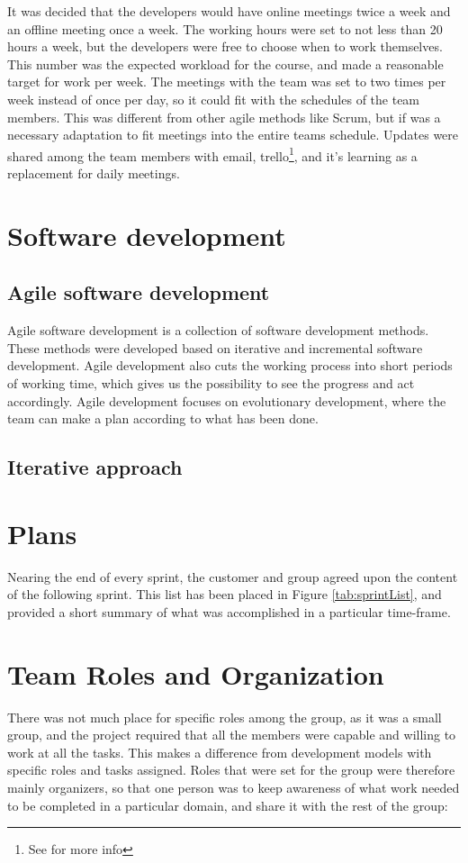 It was decided that the developers would have online meetings twice a week and an offline meeting once a week. 
The working hours were set to not less than 20 hours a week, but the developers were free to choose when to work themselves. This number was the expected workload for the course, and made a reasonable target for work per week. The meetings with the team was set to two times per week instead of once per day, so it could fit with the schedules of the team members. This was different from other agile methods like Scrum, but if was a necessary adaptation to fit meetings into the entire teams schedule. Updates were shared among the team members with email, trello\footnote{See \pageref{def:trello} for more info}, and it's learning as a replacement for daily meetings.
\section{Software development}
\subsection{Agile software development}
Agile software development is a collection of software development methods. These methods were developed based on iterative and incremental software development. Agile development also cuts the working process into short periods of working time, which gives us the possibility to see the progress and act accordingly. Agile development focuses on evolutionary development, where the team can make a plan according to what has been done.  

\subsection{Iterative approach}

\section{Plans}

Nearing the end of every sprint, the customer and group agreed upon the content of the following sprint. This list has been placed in Figure \ref{tab:sprintList}, and provided a short summary of what was accomplished in a particular time-frame. 


\section{Team Roles and Organization}
There was not much place for specific roles among the group, as it was a small group, and the project required that all the members were capable and willing to work at all the tasks. This makes a difference from development models with specific roles and tasks assigned. Roles that were set for the group were therefore mainly organizers, so that one person was to keep awareness of what work needed to be completed in a particular domain, and share it with the rest of the group:

